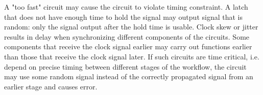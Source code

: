 \documentclass[11pt,letterpaper,titlepage]{article}
\begin{document}
\begin{enumerate}
     A "too fast" circuit may cause the circuit to violate timing constraint. A latch that does not have enough time to hold the signal may output signal that is random: only the signal output after the hold time is usable. Clock skew or jitter results in delay when synchronizing different components of the circuits. Some components that receive the clock signal earlier may carry out functions earlier than those that receive the clock signal later. If such circuits are time critical, i.e. depend on precise timing between different stages of the workflow, the circuit may use some random signal instead of the correctly propagated signal from an earlier stage and causes error.
    
\end{enumerate}
\end{document}
